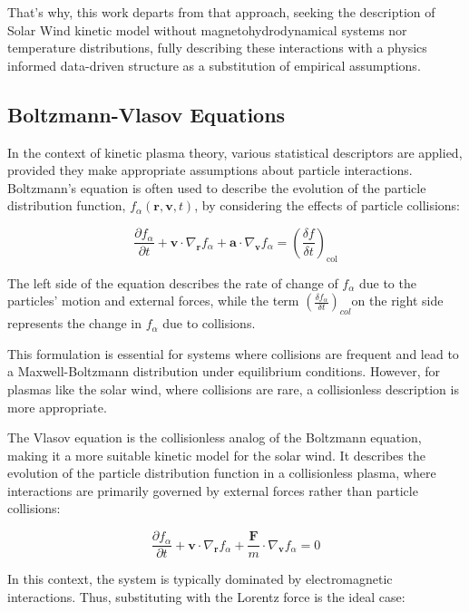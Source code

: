 \documentclass[12pt]{article}
\begin{document}
That's why, this work departs from that approach, seeking the description of Solar Wind kinetic model without magnetohydrodynamical systems nor temperature distributions, fully describing these interactions with a physics informed data-driven structure as a substitution of empirical assumptions.

\subsection{Boltzmann-Vlasov Equations}

In the context of kinetic plasma theory, various statistical descriptors are applied, provided they make appropriate assumptions about particle interactions. Boltzmann's equation is often used to describe the evolution of the particle distribution function, $f_\alpha(\mathbf{r}, \mathbf{v}, t)$, by considering the effects of particle collisions:

\begin{equation}
    \frac{\partial f_\alpha}{\partial t} + \mathbf{v} \cdot \nabla_{\mathbf{r}} f_\alpha + \mathbf{a} \cdot \nabla_{\mathbf{v}} f_\alpha = \left(\frac{\delta f}{\delta t}\right)_{\mathrm{col}}
\end{equation}

The left side of the equation describes the rate of change of $f_\alpha$ due to the particles' motion and external forces, while the term $\left( \frac{\delta f_\alpha}{\delta t} \right)_{col}$on the right side represents the change in $f_\alpha$ due to collisions.

This formulation is essential for systems where collisions are frequent and lead to a Maxwell-Boltzmann distribution under equilibrium conditions. However, for plasmas like the solar wind, where collisions are rare, a collisionless description is more appropriate.

The Vlasov equation is the collisionless analog of the Boltzmann equation, making it a more suitable kinetic model for the solar wind. It describes the evolution of the particle distribution function in a collisionless plasma, where interactions are primarily governed by external forces rather than particle collisions:

\begin{equation} \frac{\partial f_\alpha}{\partial t} + \mathbf{v} \cdot \nabla_{\mathbf{r}} f_\alpha + \frac{\mathbf{F}}{m} \cdot \nabla_{\mathbf{v}} f_\alpha = 0 \end{equation}

In this context, the system is typically dominated by electromagnetic interactions. Thus, substituting with the Lorentz force is the ideal case:
\end{document}
